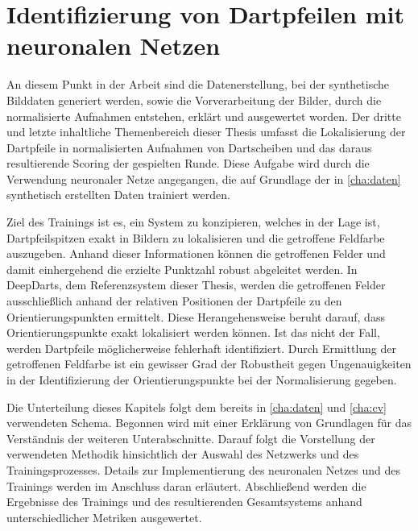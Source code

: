 
\chapter{Identifizierung von Dartpfeilen mit neuronalen Netzen}
\label{cha:ki}

An diesem Punkt in der Arbeit sind die Datenerstellung, bei der synthetische Bilddaten generiert werden, sowie die Vorverarbeitung der Bilder, durch die normalisierte Aufnahmen entstehen, erklärt und ausgewertet worden. Der dritte und letzte inhaltliche Themenbereich dieser Thesis umfasst die Lokalisierung der Dartpfeile in normalisierten Aufnahmen von Dartscheiben und das daraus resultierende Scoring der gespielten Runde. Diese Aufgabe wird durch die Verwendung neuronaler Netze angegangen, die auf Grundlage der in \autoref{cha:daten} synthetisch erstellten Daten trainiert werden.

Ziel des Trainings ist es, ein System zu konzipieren, welches in der Lage ist, Dartpfeilspitzen exakt in Bildern zu lokalisieren und die getroffene Feldfarbe auszugeben. Anhand dieser Informationen können die getroffenen Felder und damit einhergehend die erzielte Punktzahl robust abgeleitet werden. In DeepDarts, dem Referenzsystem dieser Thesis, werden die getroffenen Felder ausschließlich anhand der relativen Positionen der Dartpfeile zu den Orientierungspunkten ermittelt. Diese Herangehensweise beruht darauf, dass Orientierungspunkte exakt lokalisiert werden können. Ist das nicht der Fall, werden Dartpfeile möglicherweise fehlerhaft identifiziert. Durch Ermittlung der getroffenen Feldfarbe ist ein gewisser Grad der Robustheit gegen Ungenauigkeiten in der Identifizierung der Orientierungspunkte bei der Normalisierung gegeben.

Die Unterteilung dieses Kapitels folgt dem bereits in \autoref{cha:daten} und \autoref{cha:cv} verwendeten Schema. Begonnen wird mit einer Erklärung von Grundlagen für das Verständnis der weiteren Unterabschnitte. Darauf folgt die Vorstellung der verwendeten Methodik hinsichtlich der Auswahl des Netzwerks und des Trainingsprozesses. Details zur Implementierung des neuronalen Netzes und des Trainings werden im Anschluss daran erläutert. Abschließend werden die Ergebnisse des Trainings und des resultierenden Gesamtsystems anhand unterschiedlicher Metriken ausgewertet.





